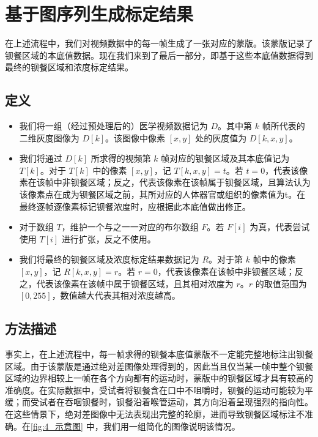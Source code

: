 \section{基于图序列生成标定结果}\label{sec:4}

在上述流程中，我们对视频数据中的每一帧生成了一张对应的蒙版。该蒙版记录了钡餐区域的本底值数据。现在我们来到了最后一部分，即基于这些本底值数据得到最终的钡餐区域和浓度标定结果。

\subsection{定义}\label{sec:4_1}
\begin{itemize}
    \item 我们将一组（经过预处理后的）医学视频数据记为 $D$。其中第 $k$ 帧所代表的二维灰度图像为 $D[k]$。该图像中像素 $[x, y]$ 处的灰度值为 $D[k, x, y]$。
    \item 我们将通过 $D[k]$ 所求得的视频第 $k$ 帧对应的钡餐区域及其本底值记为 $T[k]$。对于 $T[k]$ 中的像素 $[x, y]$，记 $T[k, x, y]=t$。若 $t=0$，代表该像素在该帧中非钡餐区域；反之，代表该像素在该帧属于钡餐区域，且算法认为该像素点在成为钡餐区域之前，其所对应的人体器官或组织的像素值为t。在最终逐帧逐像素标记钡餐浓度时，应根据此本底值做出修正。
    \item 对于数组 $T$，维护一个与之一一对应的布尔数组 $F$。若 $F[i]$ 为真，代表尝试使用 $T[i]$ 进行扩张，反之不使用。
    \item 我们将最终的钡餐区域及浓度标定结果数据记为 $R$。对于第 $k$ 帧中的像素 $[x, y]$，记 $R[k, x, y]=r$。若 $r=0$，代表该像素在该帧中非钡餐区域；反之，代表该像素在该帧中属于钡餐区域，且其相对浓度为 $r$。$r$ 的取值范围为 $[0, 255]$，数值越大代表其相对浓度越高。
\end{itemize}

\subsection{方法描述}

事实上，在上述流程中，每一帧求得的钡餐本底值蒙版不一定能完整地标注出钡餐区域。由于该蒙版是通过绝对差图像处理得到的，因此当且仅当某一帧中整个钡餐区域的边界相较上一帧在各个方向都有的运动时，蒙版中的钡餐区域才具有较高的准确度。在实际数据中，受试者将钡餐含在口中不咀嚼时，钡餐的运动可能较为平缓；而受试者在吞咽钡餐时，钡餐沿着喉管运动，其方向沿着呈现强烈的指向性。在这些情景下，绝对差图像中无法表现出完整的轮廓，进而导致钡餐区域标注不准确。在\cref{fig:4_示意图} 中，我们用一组简化的图像说明该情况。

